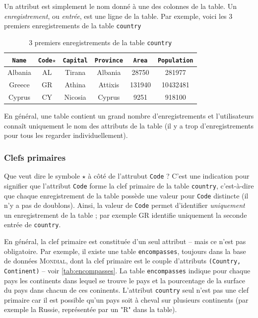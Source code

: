Un attribut est simplement le nom donné à une des colonnes de la table. Un \textit{enregistrement}, ou \textit{entrée}, est une ligne de la table. Par exemple, voici les 3 premiers enregistrements de la table \texttt{country}
\begin{table}[h!]
	\centering
	\begin{tabular}{|cccccc|}
		\hline
		\texttt{Name} & \texttt{Code}$ \star $ & \texttt{Capital} & \texttt{Province} & \texttt{Area} & \texttt{Population} \\ \hline
		Albania       & AL                     & Tirana           & Albania           & 28750         & 281977              \\
		Greece        & GR                     & Athina           & Attixis           & 131940        & 10432481            \\
		Cyprus        & CY                     & Nicosia          & Cyprus            & 9251          & 918100              \\ \hline
	\end{tabular}
	\caption{3 premiers enregistrements de la table \texttt{country} }
	\label{tab:country}
\end{table}

En général, une table contient un grand nombre d'enregistrements et l'utilisateurs connaît uniquement le nom des attributs de la table (il y a trop d'enregistrements pour tous les regarder individuellement).

\subsubsection*{Clefs primaires}
Que veut dire le symbole $ \star $ à côté de l'attrubut \texttt{Code} ? C'est une indication pour signifier que l'attribut \texttt{Code} forme la clef primaire de la table \texttt{country}, c'est-à-dire que chaque enregistrement de la table possède une valeur pour \texttt{Code} distincte (il n'y a pas de doublons). Ainsi, la valeur de \texttt{Code} permet d'identifier \textit{uniquement} un enregistrement de la table ; par exemple GR identifie uniquement la seconde entrée de \texttt{country}.

En général, la clef primaire est constituée d'un seul attribut -- mais ce n'est pas obligatoire. Par exemple, il existe une table \texttt{encompasses}, toujours dans la base de données \textsc{Mondial}, dont la clef primaire est le couple d'attributs \texttt{(Country, Continent)} -- voir \autoref{tab:encompasses}. La table \texttt{encompasses} indique pour chaque pays les continents dans lequel se trouve le pays et la pourcentage de la surface du pays dans chacun de ces coninents. L'attribut \texttt{country} seul n'est pas une clef primaire car il est possible qu'un pays soit à cheval sur plusieurs continents (par exemple la Russie, représentée par un "R" dans la table).


